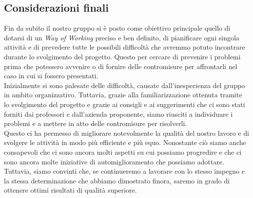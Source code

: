 
\subsection{Considerazioni finali}
Fin da subito il nostro gruppo si è posto come obiettivo principale quello di dotarsi di un \textit{Way of Working} preciso 
e ben definito, di pianificare ogni singola attività e di prevedere tutte le possibili difficoltà che avremmo potuto incontrare
durante lo svolgimento del progetto. Questo per cercare di prevenire i problemi prima che potessero avvenire o di fornire delle 
contromisure per affrontarli nel caso in cui si fossero presentati. \\
Inizialmente si sono palesate delle difficoltà, causate dall'inesperienza del gruppo in ambito organizzativo. Tuttavia, grazie alla 
familiarizzazione ottenuta tramite lo svolgimento del progetto e grazie ai consigli e ai suggerimenti che ci 
sono stati forniti dai professori e dall'azienda proponente, 
siamo riusciti a individuare i problemi e a mettere in atto delle contromisure per risolverli. \\
Questo ci ha permesso di migliorare notevolmente la qualità del nostro lavoro e di svolgere le attività in modo più efficiente e più equo. 
Nonostante ciò siamo anche consapevoli che ci sono ancora molti aspetti su cui possiamo progredire e che ci sono ancora molte 
iniziative di automiglioramento che possiamo adottare. Tuttavia, siamo convinti che, se continueremo a lavorare con lo stesso impegno e 
la stessa determinazione che abbiamo dimostrato finora, saremo in grado di ottenere ottimi risultati di qualità superiore.